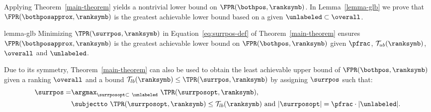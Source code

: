 Applying Theorem~\ref{main-theorem} yields a nontrivial lower bound on $\FPR(\bothpos,\ranksymb)$. In Lemma~\ref*{lemma-glb} we prove that $\FPR(\bothposapprox,\ranksymb)$ is the greatest achievable lower bound based on a given $\unlabeled\subset\overall$.

\begin{replemma}{lemma-glb}
Minimizing $\TPR(\surrpos, \ranksymb)$ in Equation~\eqref{eq:surrpos-def} of Theorem~\ref{main-theorem} ensures $\FPR(\bothposapprox, \ranksymb)$ is the greatest achievable lower bound on $\FPR(\bothpos, \ranksymb)$ given $\pfrac$, $\mathcal{T}_{ub}(\ranksymb)$, $\overall$ and $\unlabeled$. 
\end{replemma}

Due to its symmetry, Theorem~\ref{main-theorem} can also be used to obtain the least achievable upper bound of $\FPR(\bothpos, \ranksymb)$ given a ranking $\overall$ and a bound $\mathcal{T}_{lb}(\ranksymb) \leq \TPR(\surrpos, \ranksymb)$ by assigning $\surrpos$ such that:
\begin{align}
\surrpos = &\argmax_{\surrposopt\subset\ \unlabeled}\ \TPR(\surrposopt, \ranksymb), \label{eq:surrpos-def-ub} \\
&\subjectto\ \TPR(\surrposopt,\ranksymb) \leq \mathcal{T}_{lb}(\ranksymb) \text{ and } |\surrposopt|=\pfrac\cdot|\unlabeled| \nonumber. 
\end{align}

